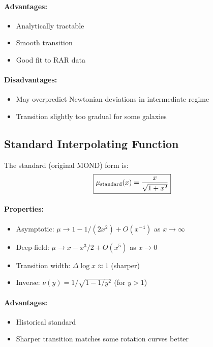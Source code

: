 \paragraph{Advantages:}
\begin{itemize}
\item Analytically tractable
\item Smooth transition
\item Good fit to RAR data
\end{itemize}

\paragraph{Disadvantages:}
\begin{itemize}
\item May overpredict Newtonian deviations in intermediate regime
\item Transition slightly too gradual for some galaxies
\end{itemize}

\subsection{Standard Interpolating Function}\label{app:mu_standard}

The standard (original MOND) form is:
\begin{equation}
\boxed{\mu_{\rm standard}(x) = \frac{x}{\sqrt{1+x^2}}}
\end{equation}

\paragraph{Properties:}
\begin{itemize}
\item Asymptotic: $\mu \to 1 - 1/(2x^2) + O(x^{-4})$ as $x \to \infty$
\item Deep-field: $\mu \to x - x^3/2 + O(x^5)$ as $x \to 0$
\item Transition width: $\Delta \log x \approx 1$ (sharper)
\item Inverse: $\nu(y) = 1/\sqrt{1 - 1/y^2}$ (for $y > 1$)
\end{itemize}

\paragraph{Advantages:}
\begin{itemize}
\item Historical standard
\item Sharper transition matches some rotation curves better
\end{itemize}

